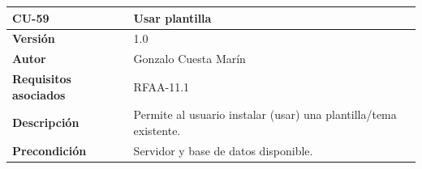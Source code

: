 \documentclass[
]{article}
\begin{document}
\begin{longtable}[]{@{}ll@{}}
\toprule
\begin{minipage}[b]{0.23\columnwidth}\raggedright
\textbf{CU-59}\strut
\end{minipage} & \begin{minipage}[b]{0.71\columnwidth}\raggedright
\textbf{Usar plantilla}\strut
\end{minipage}\tabularnewline
\midrule
\endhead
\begin{minipage}[t]{0.23\columnwidth}\raggedright
\textbf{Versión}\strut
\end{minipage} & \begin{minipage}[t]{0.71\columnwidth}\raggedright
1.0\strut
\end{minipage}\tabularnewline
\begin{minipage}[t]{0.23\columnwidth}\raggedright
\textbf{Autor}\strut
\end{minipage} & \begin{minipage}[t]{0.71\columnwidth}\raggedright
Gonzalo Cuesta Marín\strut
\end{minipage}\tabularnewline
\begin{minipage}[t]{0.23\columnwidth}\raggedright
\textbf{Requisitos asociados}\strut
\end{minipage} & \begin{minipage}[t]{0.71\columnwidth}\raggedright
RFAA-11.1\strut
\end{minipage}\tabularnewline
\begin{minipage}[t]{0.23\columnwidth}\raggedright
\textbf{Descripción}\strut
\end{minipage} & \begin{minipage}[t]{0.71\columnwidth}\raggedright
Permite al usuario instalar (usar) una plantilla/tema existente.\strut
\end{minipage}\tabularnewline
\begin{minipage}[t]{0.23\columnwidth}\raggedright
\textbf{Precondición}\strut
\end{minipage} & \begin{minipage}[t]{0.71\columnwidth}\raggedright
Servidor y base de datos disponible.


\end{minipage}
\end{longtable}
\end{document}
